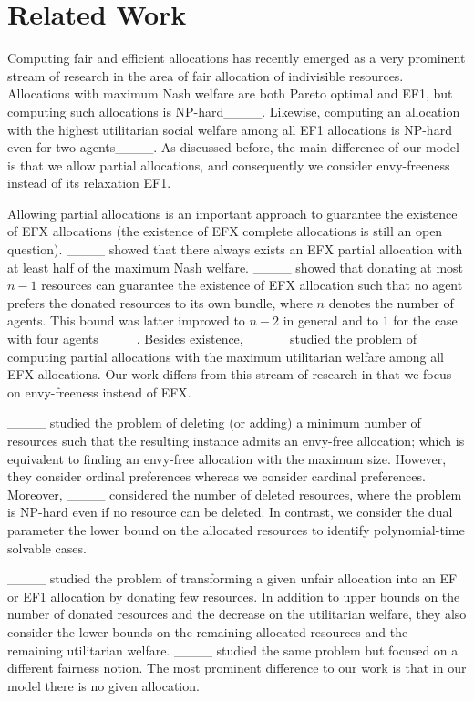 \section{Related Work}
	
	Computing fair and efficient allocations has recently emerged as a very
	prominent stream of research in the area of fair allocation of indivisible
	resources. Allocations with maximum Nash welfare are both Pareto optimal and EF1, but computing such allocations is
	NP-hard____. Likewise, computing an allocation with the highest
	utilitarian social welfare among all EF1 allocations is NP-hard even for two
	agents____. As discussed before, the main difference of our model
	is that we allow partial allocations, and consequently we consider envy-freeness
	instead of its relaxation EF1.
	
	
	Allowing partial allocations is an important approach to guarantee the existence
	of EFX allocations (the existence of EFX complete allocations is still an open question).  
	____ showed that there always exists an EFX
	partial allocation with at least half of the maximum Nash welfare.
	____ showed that donating at most $n-1$
	resources can guarantee the existence of EFX allocation such that no agent prefers the
	donated resources to its own bundle, where $n$ denotes the number of agents.
	This bound was latter improved to $n-2$ in general and to $1$ for the case with
	four agents____.
	Besides existence, ____ studied the problem of computing partial
	allocations with the maximum utilitarian welfare among all EFX allocations.
	Our work differs from this stream of research in that we focus on envy-freeness
	instead of EFX.
	
	____ studied the problem of deleting (or adding) a minimum number of
	resources such that the resulting instance admits an envy-free allocation; which
	is equivalent to finding an envy-free allocation with the maximum size.
	However, they consider ordinal preferences whereas we consider cardinal preferences.
	Moreover, ____ considered the number of deleted resources, where the
	problem is NP-hard even if no resource can be deleted. In contrast, we consider
	the dual parameter the lower bound on the allocated resources to identify polynomial-time solvable cases.
	
	____ studied the problem of transforming a given unfair allocation into an
	EF or EF1 allocation by donating few resources.
	In addition to upper bounds on the number of donated resources and the decrease
	on the utilitarian welfare, they also consider the lower bounds on the remaining
	allocated resources and the remaining utilitarian welfare.
	____ studied the same problem but focused
	on a different fairness notion.
	The most prominent difference to our work is that in our model there is no given
	allocation.
	
